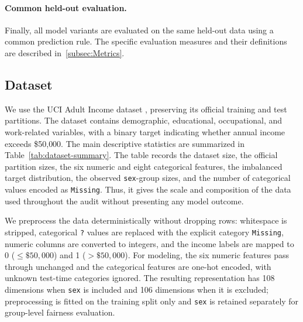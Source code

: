 \documentclass{article}
\begin{document}
\paragraph{Common held-out evaluation.}
Finally, all model variants are evaluated on the same held-out data using a
common prediction rule. The specific evaluation measures and their definitions 
are described in~\ref{subsec:Metrics}.

\subsection{Dataset}\label{subsec:Data}
We use the UCI Adult Income dataset \citep{dua2019uci}, preserving its
official training and test partitions. The dataset contains demographic,
educational, occupational, and work-related variables, with a binary target
indicating whether annual income exceeds \$50{,}000. The main descriptive
statistics are summarized in Table~\ref{tab:dataset-summary}. The table
records the dataset size, the official partition sizes, the six numeric and
eight categorical features, the imbalanced target distribution, the observed
\texttt{sex}-group sizes, and the number of categorical values encoded as
\texttt{Missing}. Thus, it gives the scale and composition of the data used
throughout the audit without presenting any model outcome.

We preprocess the data deterministically without dropping rows: whitespace is
stripped, categorical \texttt{?} values are replaced with the explicit
category \texttt{Missing}, numeric columns are converted to integers, and the
income labels are mapped to 0 (\(\leq\$50{,}000\)) and 1 (\(>\$50{,}000\)).
For modeling, the six numeric features pass through unchanged and the
categorical features are one-hot encoded, with unknown test-time categories
ignored. The resulting representation has 108 dimensions when \texttt{sex}
is included and 106 dimensions when it is excluded; preprocessing is fitted
on the training split only and \texttt{sex} is retained separately for
group-level fairness evaluation.
\end{document}
